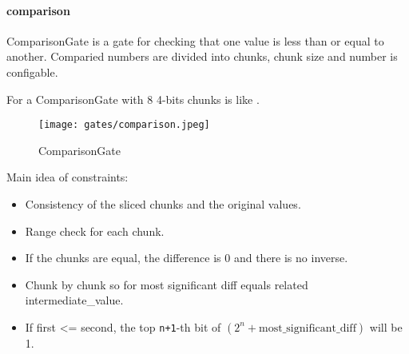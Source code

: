 \paragraph{comparison}

ComparisonGate is a gate for checking that one value is less than or equal to another. 
Comparied numbers are divided into chunks, chunk size and number is configable.

For a ComparisonGate with 8 4-bits chunks is like .

\begin{figure}[!ht]
    \centering
    \texttt{[image: gates/comparison.jpeg]}
    \caption{ComparisonGate}
    \label{fig:comparison}
\end{figure}

Main idea of constraints:
\begin{itemize}
    \item Consistency of the sliced chunks and the original values.
    \item Range check for each chunk.
    \item If the chunks are equal, the difference is 0 and there is no inverse.
    \item Chunk by chunk so for most significant diff equals related intermediate\_value.
    \item If first <= second, the top \verb|n+1|-th bit of $(2^n + \text{most\_significant\_diff})$ will be 1.
\end{itemize}
